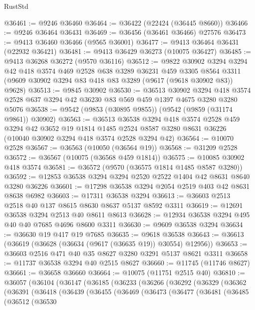 \begin{lexlean}{RustStd}
\begin{coremodule}
@36461 := @9246 @36460
@36464 := @36422 (@22424 (@36445 @8660))
@36466 := @9246 @36464 @36431
@36469 := @36456 (@36461 @36466) @27576
@36473 := @9413 @36460 @36466 (@9565 @36001)
@36477 := @9413 @36464 @36431 (@22932 @36421)
@36481 := @9413 @36429 @36273 (@10075 @36427)
@36485 := @9413 @36268 @36272 (@9570 @36116)
@36512 := @9822
    @30902
    @3294
    @3294
    @42
    @418
    @3574
    @469
    @2528
    @638
    @3289
    @36231
    @459
    @3305
    @8564
    @3311
    (@9609 @30902 @3294 @83 @418 @83 @3289 (@9617 (@9618 @30902 @83)) @9628)
@36513 := @9845 @30902
@36530 := @36513
    @30902
    @3294
    @418
    @3574
    @2528
    @637
    @3294
    @42
    @36230
    @83
    @569
    @459
    @1397
    @4675
    @3280
    @3280
    @5076
@36538 := @9542 (@9853 (@30895 @9855)) (@9542 (@9859 (@31174 @9861)) @30902)
@36563 := @36513
    @36538
    @3294
    @418
    @3574
    @2528
    @459
    @3294
    @42
    @3652
    @19
    @1814
    @1485
    @2524
    @8587
    @3280
    @8631
    @36226
    (@10040 @30902 @3294 @418 @3574 @2528 @3294 @42)
@36564 := @10070 @2528
@36567 := @36563 (@10050 (@36564 @19))
@36568 := @31209 @2528
@36572 := @36567 (@10075 (@36568 @459 @1814))
@36575 := @10085 @30902 @418 @3574
@36581 := @36572 (@9570 (@36575 @1814 @1485 @8587 @3280))
@36592 := @12853 @36538 @3294 @3294 @2520 @2522 @1404 @42 @8631 @8640 @3280 @36226
@36601 := @17298 @36538 @3294 @2054 @2519 @403 @42 @8631 @8638 @6982
@36603 := @17311 @36538 @3294
@36613 := @36603 @2513 @2518 @40 @137 @8615 @8630 @8637 @5137 @8592 @3311
@36619 := @12691 @36538 @3294 @2513 @40 @8611 @8613
@36628 := @12934 @36538 @3294 @495 @40 @40 @7685 @4696 @8600 @3311
@36630 := @9609 @36538 @3294
@36634 := @36630 @19 @417 @19 @7685
@36635 := @9618 @36538
@36643 := @36613 (@36619 (@36628 (@36634 (@9617 (@36635 @19)) @30554) @12956))
@36653 := @36603 @2516 @471 @40 @35 @8627 @3280 @3291 @5137 @8621 @3311
@36658 := @11737 @36538 @3294 @40 @2515 @8627
@36660 := @11745 (@11746 @8627)
@36661 := @36658 @36660
@36664 := @10075 (@11751 @2515 @40)
@36810 := @36057
    (@36104
      (@36147
        (@36185
          (@36233
            (@36266
              (@36292
                (@36329
                  (@36362
                    (@36391
                      (@36418
                        (@36439
                          (@36455
                            (@36469
                              (@36473
                                (@36477
                                  (@36481
                                    (@36485
                                      (@36512
                                        (@36530

\end{coremodule}
\end{lexlean}
